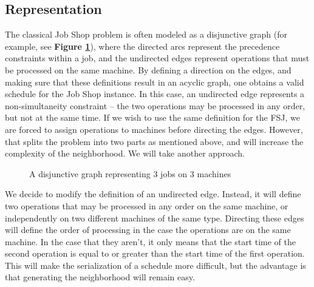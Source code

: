 \documentclass[a4paper,11pt]{article}
\begin{document}
\subsection{Representation}

The classical Job Shop problem is often modeled as a disjunctive graph (for example, see \textbf{Figure \ref{fig:disjunctivegraph}}), where the directed arcs represent the precedence constraints within a job, and the undirected edges represent operations that must be processed on the same machine. By defining a direction on the edges, and making sure that these definitions result in an acyclic graph, one obtains a valid schedule for the Job Shop instance. In this case, an undirected edge represents a non-simultaneity constraint -- the two operations may be processed in any order, but not at the same time. If we wish to use the same definition for the FSJ, we are forced to assign operations to machines before directing the edges. However, that splits the problem into two parts as mentioned above, and will increase the complexity of the neighborhood. We will take another approach.

\begin{figure}[h]
\centering
{}
\caption{A disjunctive graph representing 3 jobs on 3 machines}
\label{fig:disjunctivegraph}
\end{figure}

We decide to modify the definition of an undirected edge. Instead, it will define two operations that may be processed in any order on the same machine, or independently on two different machines of the same type. Directing these edges will define the order of processing in the case the operations are on the same machine. In the case that they aren't, it only means that the start time of the second operation is equal to or greater than the start time of the first operation. This will make the serialization of a schedule more difficult, but the advantage is that generating the neighborhood will remain easy.
\end{document}
